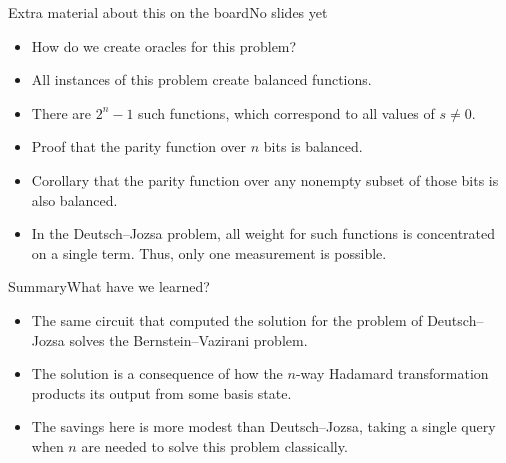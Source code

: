 \begin{frame}{Extra material about this on the board}{No slides yet}

\begin{itemize}
    \item How do we create oracles for this problem?
    \item All instances of this problem create balanced functions.
    \item There are $2^{n}-1$ such functions, which correspond to all values of $s\not=0$.
    \item Proof that the parity function over $n$ bits is balanced.
    \item Corollary that the parity function over any nonempty subset of those bits is also balanced.
    \item In the Deutsch--Jozsa problem, all weight for such functions is concentrated on a single term.  Thus, only one measurement is possible.
\end{itemize}
    
\end{frame}

\begin{frame}{Summary}{What have we learned?}

\begin{itemize}
    \item The same circuit that computed the solution for the problem of Deutsch--Jozsa solves the Bernstein--Vazirani problem.
    \item The solution is a consequence of how the $n$-way Hadamard transformation products its output from some basis state.
    \item The savings here is more modest than Deutsch--Jozsa, taking a single query when $n$ are needed to solve this problem classically.
\end{itemize}
    
\end{frame}
